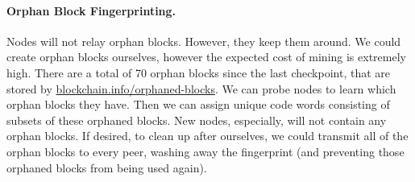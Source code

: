 \paragraph{Orphan Block Fingerprinting.}
Nodes will not relay orphan blocks. However, they keep them around. We could create orphan blocks ourselves, however the expected cost of mining is extremely high.
There are a total of 70 orphan blocks since the last checkpoint, that are stored by \url{blockchain.info/orphaned-blocks}.
We can probe nodes to learn which orphan blocks they have. Then we can assign unique code words consisting of subsets of these orphaned blocks.
New nodes, especially, will not contain any orphan blocks.
If desired, to clean up after ourselves, we could transmit all of the orphan blocks to every peer, washing away the fingerprint (and preventing those orphaned blocks from being used again).
